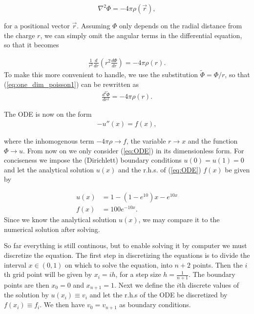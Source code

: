 \documentclass[twocolumn]{aastex62}
\begin{document}
\begin{equation}
	\nabla^2\Phi = -4\pi\rho(\vec{r}),
\end{equation}

for a positional vector $\vec{r}$. Assuming $\Phi$ only depends on the radial distance from the charge $r$, we can simply omit the angular terms in the differential equation, so that it becomes
 
\begin{align}
	\frac{1}{r^2}\frac{d}{dr}\left(r^2\frac{d\Phi}{dr}\right) = -4\pi\rho(r).
\label{eq:one_dim_poisson1}	
\end{align}
To make this more convenient to handle, we use the substitution $\tilde{\Phi} = \Phi/r$, so that (\ref{eq:one_dim_poisson1}) can be rewritten as 
\begin{align}
	\frac{d^2\tilde{\Phi}}{dr^2} = -4\pi\rho(r).
\end{align}

The ODE is now on the form 
\begin{align}
	-u''(x) = f(x),
	\label{eq:ODE}
\end{align}

where the inhomogenous term $-4\pi\rho\to f$, the variable $r\to x$ and the function $\Phi\to u$. From now on we only consider (\ref{eq:ODE}) in its dimensionless form. For conciseness we impose the (Dirichlett) boundary conditions $u(0) = u(1) = 0$ and let the analytical solution $u(x)$ and the r.h.s. of (\ref{eq:ODE}) $f(x)$ be given by

\begin{align}
	u(x) &= 1 - (1 - e^{10})x - e^{10x}\label{eq:analytical}\\
	f(x) &= 100e^{-10x}.
\end{align}
Since we know the analytical solution $u(x)$, we may compare it to the numerical solution after solving.

So far everything is still continous, but to enable solving it by computer we must discretize the equation. The first step in discretizing the equations is to divide the interval $x\in(0,1)$ on which to solve the equation, into $n+2$ points. Then the $i$th grid point will be given by $x_i = ih$, for a step size $h = \frac{1}{n + 1}$. The boundary points are then $x_0 = 0$ and $x_{n+1} = 1$. Next we define the $i$th discrete values of the solution by $u(x_i) \equiv v_i$ and let the r.h.s of the ODE be discretized by $f(x_i) \equiv f_i$. We then have $v_0 = v_{n+1}$ as boundary conditions.
\end{document}
